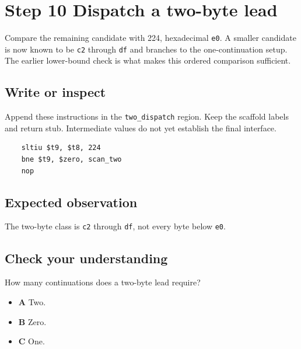 \section{Step 10 Dispatch a two-byte lead}\label{utf8-s10}

Compare the remaining candidate with 224, hexadecimal \texttt{e0}. A smaller candidate is now known to be \texttt{c2} through \texttt{df} and branches to the one-continuation setup. The earlier lower-bound check is what makes this ordered comparison sufficient.

\subsection{Write or inspect}
Append these instructions in the \texttt{two\_dispatch} region. Keep the scaffold labels and return stub. Intermediate values do not yet establish the final interface.

\begin{verbatim}
    sltiu $t9, $t8, 224
    bne $t9, $zero, scan_two
    nop
\end{verbatim}

\subsection{Expected observation}
The two-byte class is \texttt{c2} through \texttt{df}, not every byte below \texttt{e0}.

\subsection{Check your understanding}
How many continuations does a two-byte lead require?

\begin{itemize}
  \item \textbf{A} Two.
  \item \textbf{B} Zero.
  \item \textbf{C} One.
\end{itemize}
